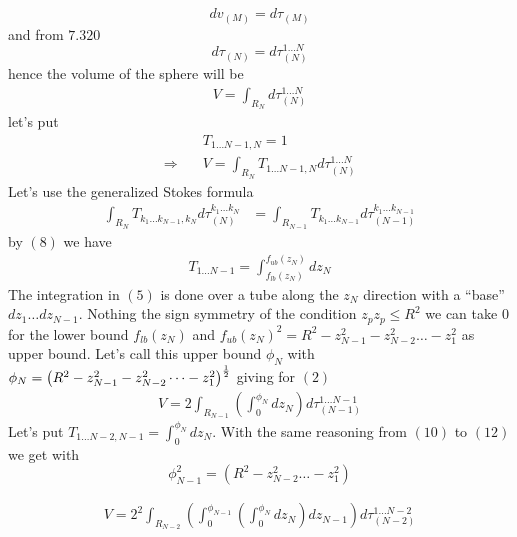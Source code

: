 $$dv_{(M)}= d\tau_{(M)}$$
and from $\mathbf{7.320}$
$$d\tau_{(N)}=d\tau_{(N)}^{1\dots N}$$
hence the volume of the sphere will be 
\begin{align}
V = \int_{R_N} d\tau_{(N)}^{1\dots N}
\end{align}
let's put
\begin{align}
&T_{1\dots N-1,N} =  1\\
\Rightarrow \quad &V = \int_{R_N} T_{1\dots N-1,N}d\tau_{(N)}^{1\dots N} 
\end{align}
Let's use the generalized Stokes formula
\begin{align}
\int_{R_N} T_{k_1\dots k_{N-1},k_N} d\tau_{(N)}^{k_1 \dots k_N} &= \int_{R_{N-1}} T_{k_1\dots k_{N-1}}d\tau_{(N-1)}^{k_1 \dots k_{N-1}}
\end{align}
by $(8)$ we have 
\begin{align}
T_{1\dots N-1} =  \int_{f_{lb}(z_{N})}^{f_{ub}(z_{N})}dz_{N} 
\end{align}
The integration in $(5)$ is done over a tube along the $z_{N}$ direction with a ``base'' $dz_{1}\dots dz_{N-1}$. Nothing the sign symmetry of the condition $z_pz_p \leq R^2$ we can take $0$  for the lower bound $f_{lb}(z_{N})$ and $f_{ub}(z_{N})^2 = R^2- z_{N-1}^2- z_{N-2}^2\dots  -z_{1}^2 $ as upper bound. Let's call this upper bound $\phi_{N}$ with $\phi_{N} =\left(R^2- z_{N-1}^2- z_{N-2}^2\dots  -z_{1}^2\right)^{\frac{1}{2}}$
giving for $(2)$
\begin{align}
V = 2\int_{R_{N-1}}\left(\int_{0}^{\phi_{N}}dz_{N}\right)d\tau_{(N-1)}^{1 \dots N-1}
\end{align}
Let's put $T_{1\dots N-2,N-1} = \int_{0}^{\phi_{N}}dz_{N}$. With the same reasoning from $(10)$ to $(12)$
we get with 
$$\phi_{N-1}^2 = \left(R^2 - z_{N-2}^2\dots  -z_{1}^2\right)$$  
 
\begin{align}
V = 2^2\int_{R_{N-2}}\left(\int_{0}^{\phi_{N-1}}\left(\int_{0}^{\phi_{N}}dz_{N}\right)dz_{N-1}\right)d\tau_{(N-2)}^{1 \dots N-2}
\end{align}

